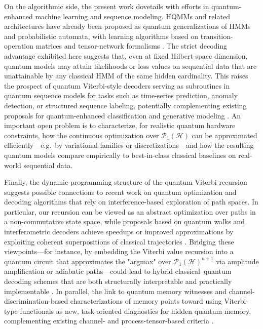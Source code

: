 \documentclass[12pt, reco]{article}
\begin{document}
On the algorithmic side, the present work dovetails with efforts in quantum-enhanced machine learning and sequence modeling. HQMMs and related architectures have already been proposed as quantum generalizations of HMMs and probabilistic automata, with learning algorithms based on transition-operation matrices and tensor-network formalisms \cite{Monras11,Srin2017}. The strict decoding advantage exhibited here suggests that, even at fixed Hilbert-space dimension, quantum models may attain likelihoods or loss values on sequential data that are unattainable by any classical HMM of the same hidden cardinality. This raises the prospect of quantum Viterbi-style decoders serving as subroutines in quantum sequence models for tasks such as time-series prediction, anomaly detection, or structured sequence labeling, potentially complementing existing proposals for quantum-enhanced classification and generative modeling \cite{SSP15,J22}. An important open problem is to characterize, for realistic quantum hardware constraints, how the continuous optimization over \(\mathcal{P}_1(\mathcal{H})\) can be approximated efficiently—e.g.\ by variational families or discretizations—and how the resulting quantum models compare empirically to best-in-class classical baselines on real-world sequential data.

Finally, the dynamic-programming structure of the quantum Viterbi recursion suggests possible connections to recent work on quantum optimization and decoding algorithms that rely on interference-based exploration of path spaces. In particular, our recursion can be viewed as an abstract optimization over paths in a non-commutative state space, while proposals based on quantum walks and interferometric decoders achieve speedups or improved approximations by exploiting coherent superpositions of classical trajectories \cite{Ambainis2003,JSW2025}. Bridging these viewpoints—for instance, by embedding the Viterbi value recursion into a quantum circuit that approximates the "argmax" over \(\mathcal{P}_1(\mathcal{H})^{n+1}\) via amplitude amplification or adiabatic paths—could lead to hybrid classical–quantum decoding schemes that are both structurally interpretable and practically implementable \cite{CFG26}. In parallel, the link to quantum memory witnesses and channel-discrimination-based characterizations of memory points toward using Viterbi-type functionals as new, task-oriented diagnostics for hidden quantum memory, complementing existing channel- and process-tensor-based criteria \cite{OZNPQ26,TaElM}.
\end{document}

